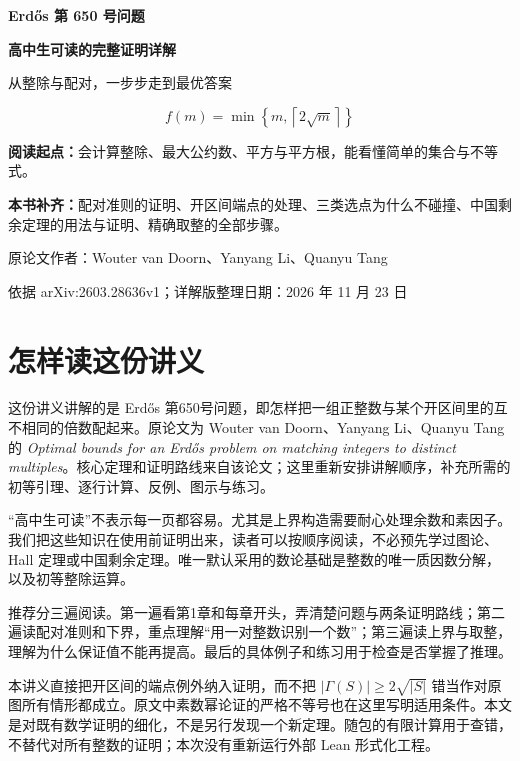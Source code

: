 \documentclass[UTF8,a4paper,oneside,openany,fontset=fandol,zihao=-4]{ctexbook}
\theoremstyle{guide}
\begin{document}
\begin{titlepage}
\centering
\vspace*{18mm}
{\bfseries Erd\H{o}s 第 650 号问题\par}
\vspace{10mm}
{\bfseries 高中生可读的完整证明详解\par}
\vspace{13mm}
{\Large 从整除与配对，一步步走到最优答案\par}
\vspace{14mm}
\[
\boxed{\displaystyle f(m)=\min\left\{m,\left\lceil2\sqrt m\right\rceil\right\}}
\]
\vspace{16mm}
\begin{minipage}{.82\textwidth}
\large
\textbf{阅读起点：}会计算整除、最大公约数、平方与平方根，能看懂简单的集合与不等式。\par\medskip
\textbf{本书补齐：}配对准则的证明、开区间端点的处理、三类选点为什么不碰撞、中国剩余定理的用法与证明、精确取整的全部步骤。
\end{minipage}
\vfill
{原论文作者：Wouter van Doorn、Yanyang Li、Quanyu Tang\par}
\vspace{3mm}
{依据 arXiv:2603.28636v1；详解版整理日期：2026 年 11 月 23 日\par}
\end{titlepage}
\frontmatter
\chapter*{怎样读这份讲义}
这份讲义讲解的是 Erd\H{o}s 第650号问题，即怎样把一组正整数与某个开区间里的互不相同的倍数配起来。原论文为 Wouter van Doorn、Yanyang Li、Quanyu Tang 的 \emph{Optimal bounds for an Erd\H{o}s problem on matching integers to distinct multiples}\cite{paper}。核心定理和证明路线来自该论文；这里重新安排讲解顺序，补充所需的初等引理、逐行计算、反例、图示与练习。

“高中生可读”不表示每一页都容易。尤其是上界构造需要耐心处理余数和素因子。我们把这些知识在使用前证明出来，读者可以按顺序阅读，不必预先学过图论、Hall 定理或中国剩余定理。唯一默认采用的数论基础是整数的唯一质因数分解，以及初等整除运算。

推荐分三遍阅读。第一遍看第1章和每章开头，弄清楚问题与两条证明路线；第二遍读配对准则和下界，重点理解“用一对整数识别一个数”；第三遍读上界与取整，理解为什么保证值不能再提高。最后的具体例子和练习用于检查是否掌握了推理。

本讲义直接把开区间的端点例外纳入证明，而不把 $|\Gamma(S)|\ge2\sqrt{|S|}$ 错当作对原图所有情形都成立。原文中素数幂论证的严格不等号也在这里写明适用条件。本文是对既有数学证明的细化，不是另行发现一个新定理。随包的有限计算用于查错，不替代对所有整数的证明；本次没有重新运行外部 Lean 形式化工程。
\end{document}
